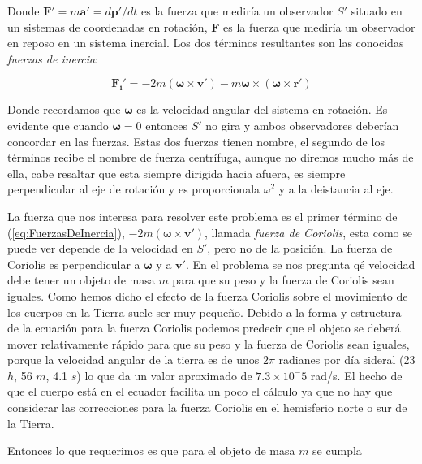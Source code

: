 \documentclass[a4paper,10pt]{article}
\begin{document}
Donde $\mathbf{F'} = m\mathbf{a'} = d\mathbf{p'}/dt$ es la fuerza que mediría un observador $S'$ situado
en un sistemas de coordenadas en rotación, $\mathbf{F}$ es la fuerza que mediría un observador
en reposo en un sistema inercial. Los dos términos resultantes son las conocidas \emph{fuerzas de inercia}:

\begin{equation}
 \mathbf{F_i'} = - 2m(\mathbf{\omega} \times \mathbf{v'}) - m\mathbf{\omega} \times (\mathbf{\omega} \times \mathbf{r'})
 \label{eq:FuerzasDeInercia}
\end{equation}

Donde recordamos que $\mathbf{\omega}$ es la velocidad angular del sistema en rotación. Es evidente que cuando $\mathbf{\omega} = 0$
entonces $S'$ no gira y ambos observadores deberían concordar en las fuerzas. Estas dos fuerzas tienen nombre, el segundo de los términos
recibe el nombre de fuerza centrífuga, aunque no diremos mucho más de ella, cabe resaltar que esta siempre dirigida hacia
afuera, es siempre perpendicular al eje de rotación y es proporcionala $\omega^2$ y a la deistancia al eje.

\vspace{.3cm}

La fuerza que nos interesa para resolver este problema es el primer término de (\ref{eq:FuerzasDeInercia}), $- 2m(\mathbf{\omega} \times \mathbf{v'})$,
llamada \emph{fuerza de Coriolis}, esta como se puede ver depende de la velocidad en $S'$, pero no de la posición. La fuerza de Coriolis 
es perpendicular a $\mathbf{\omega}$ y a $\mathbf{v'}$. En el problema se nos pregunta qé velocidad debe tener un objeto de masa $m$ para que su peso 
y la fuerza de Coriolis sean iguales. Como hemos dicho el efecto de la fuerza Coriolis sobre el movimiento de los cuerpos en la Tierra 
suele ser muy pequeño. Debido a la forma y estructura de la ecuación para la fuerza Coriolis podemos predecir que el objeto se deberá mover 
relativamente rápido para que su peso y la fuerza de Coriolis sean iguales, porque la velocidad angular de la tierra es de unos $2\pi$ 
radianes por día sideral (23 $h$, 56 $m$, 4.1 $s$) lo que da un valor aproximado de $7.3 \times 10^-5$ rad/s. El hecho de que el
cuerpo está en el ecuador facilita un poco el cálculo ya que no hay que considerar las correcciones para la fuerza Coriolis en el
hemisferio norte o sur de la Tierra.

\vspace{.3cm}

Entonces lo que requerimos es que para el objeto de masa $m$ se cumpla
\end{document}
